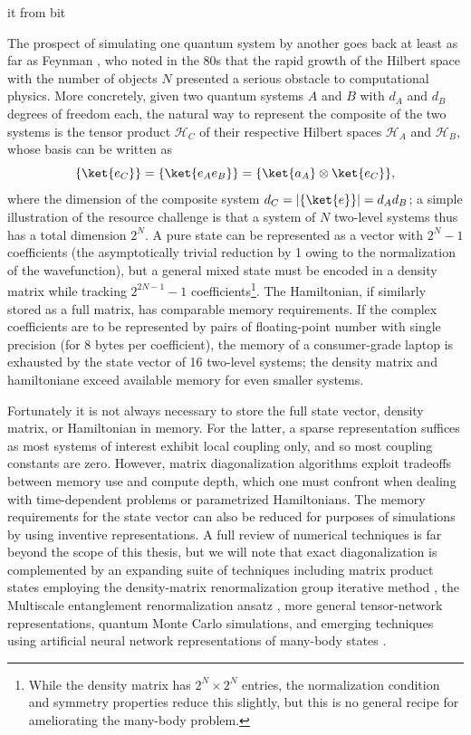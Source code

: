 	it from bit

	The prospect of simulating one quantum system by another goes back at least as far as Feynman \cite{Feynman82}, who noted in the 80s that the rapid growth of the Hilbert space with the number of objects $N$ presented a serious obstacle to computational physics.
	More concretely, given two quantum systems $A$ and $B$ with $d_A$ and $d_B$ degrees of freedom each, the natural way to represent the composite of the two systems is the tensor product $\mathcal{H}_C$ of their respective Hilbert spaces $\mathcal{H}_A$ and $\mathcal{H}_B$, whose basis can be written as
	\begin{equation}
		\{\ket{e_C}\} = \{\ket{e_A e_B}\} = \{\ket{a_A}\otimes\ket{e_C}\},
	\end{equation}
	where the dimension of the composite system $d_C = |\{\ket{e}\}| = d_A d_B$; a simple illustration of the resource challenge is that a system of $N$ two-level systems thus has a total dimension $2^N$.
	A pure state can be represented as a vector with $2^N-1$ coefficients (the asymptotically trivial reduction by 1 owing to the normalization of the wavefunction), but a general mixed state must be encoded in a density matrix while tracking $2^{2N-1}-1$  coefficients\footnote{While the density matrix has $2^N\times2^N$ entries, the normalization condition and symmetry properties reduce this slightly, but this is no general recipe for ameliorating the many-body problem.}.
	The Hamiltonian, if similarly stored as a full matrix, has comparable memory requirements.
	If the complex coefficients are to be represented by pairs of floating-point number with single precision (for 8 bytes per coefficient), the memory of a consumer-grade laptop is exhausted by the state vector of 16 two-level systems; the density matrix and hamiltoniane exceed available memory for even smaller systems.
	

	Fortunately it is not always necessary to store the full state vector, density matrix, or Hamiltonian in memory.
	For the latter, a sparse representation suffices as most systems of interest exhibit local coupling only, and so most coupling constants are zero.
	However, matrix diagonalization algorithms exploit tradeoffs between memory use and compute depth, which one must confront when dealing with time-dependent problems or parametrized Hamiltonians.
	The memory requirements for the state vector can also be reduced for purposes of simulations by using inventive representations.
	A full review of numerical techniques is far beyond the scope of this thesis, but we will note that exact diagonalization \cite{Zhang10} is complemented by an expanding suite of techniques including matrix product states \cite{Schollwoeck11} employing the density-matrix renormalization group iterative method \cite{Dechiara08}, the Multiscale entanglement renormalization ansatz \cite{}, more general tensor-network representations, quantum Monte Carlo simulations, and emerging techniques using artificial neural network representations of many-body states \cite{}.
	

